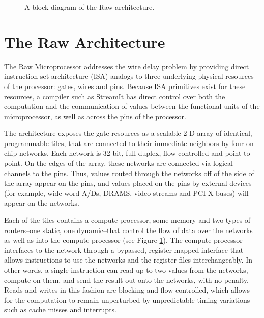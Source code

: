 \begin{figure}
\centering
{}
\caption{A block diagram of the Raw architecture.
\protect\label{fig:raw-diagram}}
\end{figure}

\section{The Raw Architecture}
\label{sec:raw}

The Raw Microprocessor \cite{raw10,raw} addresses the wire delay
problem \cite{raw13} by providing direct instruction set architecture
(ISA) analogs to three underlying physical resources of the processor:
gates, wires and pins. Because ISA primitives exist for these
resources, a compiler such as StreamIt has direct control over both
the computation and the communication of values between the functional
units of the microprocessor, as well as across the pins of the
processor.

The architecture exposes the gate resources as a scalable 2-D array of
identical, programmable tiles, that are connected to their immediate
neighbors by four on-chip networks.  Each network is 32-bit,
full-duplex, flow-controlled and point-to-point. On the edges of the
array, these networks are connected via logical channels \cite{raw11}
to the pins.  Thus, values routed through the networks off of the side
of the array appear on the pins, and values placed on the pins by
external devices (for example, wide-word A/Ds, DRAMS, video streams
and PCI-X buses) will appear on the networks.

Each of the tiles contains a compute processor, some memory and two
types of routers--one static, one dynamic--that control the flow of
data over the networks as well as into the compute processor (see
Figure \ref{fig:raw-diagram}). The compute processor interfaces to the
network through a bypassed, register-mapped interface \cite{raw10}
that allows instructions to use the networks and the register files
interchangeably. In other words, a single instruction can read up to
two values from the networks, compute on them, and send the result out
onto the networks, with no penalty.  Reads and writes in this fashion
are blocking and flow-controlled, which allows for the computation to
remain unperturbed by unpredictable timing variations such as cache
misses and interrupts.

